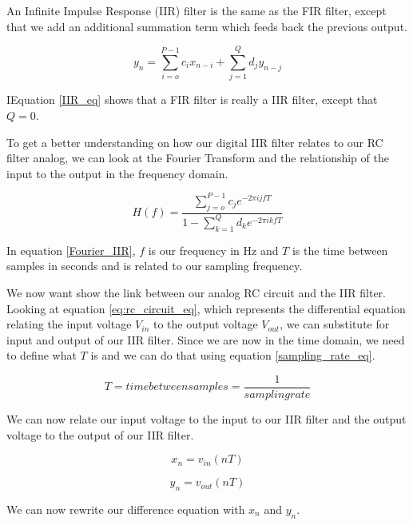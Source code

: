 An Infinite Impulse Response (IIR) filter is the same as the FIR filter, except that we add an additional summation term which feeds back the previous output.

\begin{equation}\label{IIR_eq}
y_n=\displaystyle\sum\limits_{i=o}^{P-1} c_ix_{n-i}+\displaystyle\sum\limits_{j=1}^{Q} d_jy_{n-j}
\end{equation}

IEquation \ref{IIR_eq} shows that a FIR filter is really a IIR filter, except that $Q=0$.  

To get a better understanding on how our digital IIR filter relates to our RC filter analog, we can look at the Fourier Transform and the relationship of the input to the output in the frequency domain.

\begin{equation}\label{Fourier_IIR}
H(f)=\frac{\displaystyle\sum\limits_{j=o}^{P-1} c_je^{-2\pi ijfT}}{1-\displaystyle\sum\limits_{k=1}^{Q} d_ke^{-2\pi ikfT}}
\end{equation}

In equation \ref{Fourier_IIR}, $f$ is our frequency in Hz and $T$ is the time between samples in seconds and is related to our sampling frequency.

We now want show the link between our analog RC circuit and the IIR filter.  Looking at equation \ref{eq:rc_circuit_eq}, which represents the differential equation relating the input voltage $V_{in}$ to the output voltage $V_{out}$, we can substitute for input and output of our IIR filter.  Since we are now in the time domain, we need to define what $T$ is and we can do that using equation \ref{sampling_rate_eq}.

\begin{equation}\label{sampling_rate_eq}
T=time between samples=\frac{1}{sampling rate}
\end{equation}

We can now relate our input voltage to the input to our IIR filter and the output voltage to the output of our IIR filter.

\begin{equation}\label{input_IIR}
x_n=v_{in}(nT)
\end{equation}

\begin{equation}\label{output_IIR}
y_n=v_{out}(nT)
\end{equation}

We can now rewrite our difference equation with $x_n$ and $y_n$.

